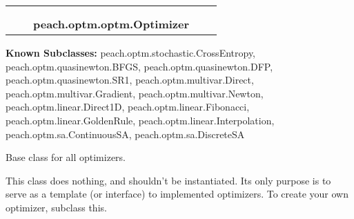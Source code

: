     \label{peach:optm:optm:Optimizer}
\begin{tabular}{cccccc}
\multicolumn{2}{r}{\settowidth{\BCL}{object}\multirow{2}{\BCL}{object}}
&&
  \\\cline{3-3}
  &&\multicolumn{1}{c|}{}
&&
  \\
&&\multicolumn{2}{l}{\textbf{peach.optm.optm.Optimizer}}
\end{tabular}

\textbf{Known Subclasses:}
peach.optm.stochastic.CrossEntropy,
    peach.optm.quasinewton.BFGS,
    peach.optm.quasinewton.DFP,
    peach.optm.quasinewton.SR1,
    peach.optm.multivar.Direct,
    peach.optm.multivar.Gradient,
    peach.optm.multivar.Newton,
    peach.optm.linear.Direct1D,
    peach.optm.linear.Fibonacci,
    peach.optm.linear.GoldenRule,
    peach.optm.linear.Interpolation,
    peach.optm.sa.ContinuousSA,
    peach.optm.sa.DiscreteSA


Base class for all optimizers.

This class does nothing, and shouldn't be instantiated. Its only purpose is
to serve as a template (or interface) to implemented optimizers. To create
your own optimizer, subclass this.

